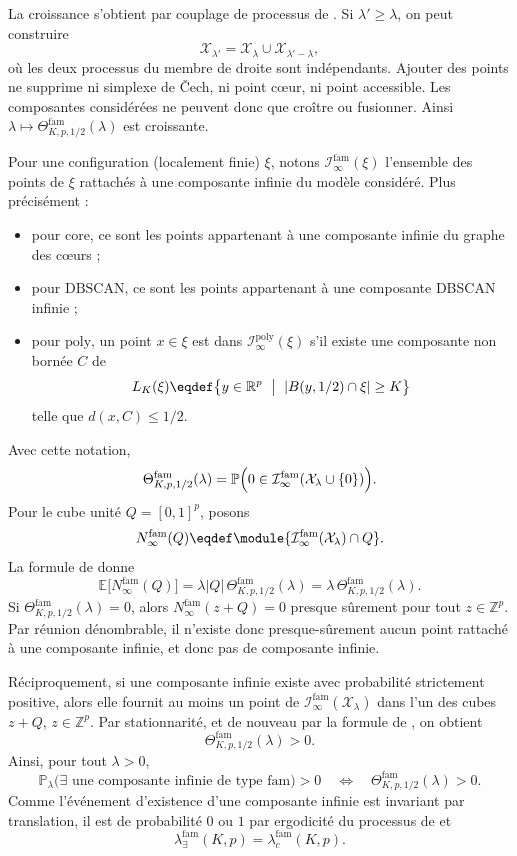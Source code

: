 \begin{Preuve}
La croissance s'obtient par couplage de processus de .
Si $\lambda'\geq\lambda$, on peut construire
\[
\mathcal X_{\lambda'}=\mathcal X_{\lambda}\cup
\mathcal X_{\lambda'-\lambda},
\]
où les deux processus du membre de droite sont indépendants. Ajouter des points ne supprime ni simplexe de \v{C}ech, ni point cœur, ni point accessible.
Les composantes considérées ne peuvent donc que croître ou fusionner. Ainsi
$\lambda\mapsto\Theta^{\mathrm{fam}}_{K,p,1/2}(\lambda)$ est croissante.

Pour une configuration (localement finie) $\xi$, notons $\mathcal I_{\infty}^{\mathrm{fam}}(\xi)$ l'ensemble des points de $\xi$ rattachés à une composante infinie du modèle considéré. Plus précisément :
\begin{itemize}
    \item pour $\mathrm{core}$, ce sont les points appartenant à une composante infinie du graphe des cœurs ;
    \item pour $\mathrm{DBSCAN}$, ce sont les points appartenant à une composante DBSCAN infinie ;
    \item pour $\mathrm{poly}$, un point $x\in\xi$ est dans $\mathcal I_{\infty}^{\mathrm{poly}}(\xi)$ s'il existe une composante non bornée $C$ de
    \[
    L_K(\xi) \eqdef \bigl\{y\in\mathbb R^p \ \bigm| \ |B(y,1/2)\cap \xi|\geq K\bigr\}
    \]
    telle que $d(x,C)\leq 1/2$.
\end{itemize}
Avec cette notation,
\[
\Theta^{\mathrm{fam}}_{K,p,1/2}(\lambda)
=
\mathbb P\Bigl(
0\in
\mathcal I_{\infty}^{\mathrm{fam}}
(\mathcal X_{\lambda}\cup\{0\})
\Bigr).
\]
Pour le cube unité $Q=[0,1]^p$, posons
\[
N_{\infty}^{\mathrm{fam}}(Q)
\eqdef
\module{
\mathcal I_{\infty}^{\mathrm{fam}}(\mathcal X_{\lambda})
\cap Q
}.
\]
La formule de  donne
\[
\mathbb E\bigl[N_{\infty}^{\mathrm{fam}}(Q)\bigr]
=
\lambda |Q|\,
\Theta^{\mathrm{fam}}_{K,p,1/2}(\lambda)
=
\lambda\,
\Theta^{\mathrm{fam}}_{K,p,1/2}(\lambda).
\]
Si
$\Theta^{\mathrm{fam}}_{K,p,1/2}(\lambda)=0$, alors
$N_{\infty}^{\mathrm{fam}}(z+Q)=0$ presque sûrement pour tout
$z\in\mathbb Z^p$. Par réunion dénombrable, il n'existe donc presque-sûrement aucun point rattaché à une composante infinie, et donc pas de composante infinie.

Réciproquement, si une composante infinie existe avec probabilité strictement positive, alors elle fournit au moins un point de $\mathcal I_{\infty}^{\mathrm{fam}}(\mathcal X_{\lambda})$ dans l'un des cubes $z+Q$, $z\in\mathbb Z^p$. Par stationnarité, et de nouveau par la formule de , on obtient
\[
\Theta^{\mathrm{fam}}_{K,p,1/2}(\lambda)>0.
\]
Ainsi, pour tout $\lambda>0$,
\[
\mathbb P_{\lambda}\bigl(
\exists\text{ une composante infinie de type }\mathrm{fam}
\bigr)>0
\quad\Longleftrightarrow\quad
\Theta^{\mathrm{fam}}_{K,p,1/2}(\lambda)>0.
\]
Comme l'événement d'existence d'une composante infinie est invariant par
translation, il est de probabilité $0$ ou $1$ par ergodicité du processus de  et
\[
\lambda^{\mathrm{fam}}_{\exists}(K,p)
=
\lambda^{\mathrm{fam}}_{c}(K,p).
\]


\end{Preuve}
